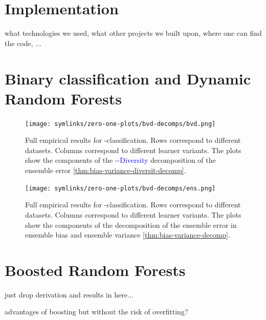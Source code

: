 \documentclass[
    a4paper, %
	fontsize=10pt, %
	twoside=false, %
]{kaobook}
\begin{document}
\begin{titlepage}
\section{Implementation}

what technologies we used, what other projects we built upon, where one can find the code, ...

\section{Binary classification and Dynamic Random Forests}
\label{sec:drf-full-results}



\begin{figure}[hb]
	\texttt{[image: symlinks/zero-one-plots/bvd-decomps/bvd.png]}
	\caption{
        Full empirical results for \zeroone-classification. Rows correspond to different datasets. Columns correspond to different learner variants. The plots show the components of the 
        \textcolor{orange}{}-\textcolor{green}{}-\textcolor{blue}{Diversity} decomposition of the ensemble error \ref{thm:bias-variance-diversit-decomp}.
    }
    \label{fig:zero-one-bvd-plots}
\end{figure}

\begin{figure}[hb]
	\texttt{[image: symlinks/zero-one-plots/bvd-decomps/ens.png]}
	\caption{
        Full empirical results for \zeroone-classification. Rows correspond to different datasets. Columns correspond to different learner variants. The plots show the components of the 
        decomposition of the ensemble error in ensemble bias and ensemble variance \ref{thm:bias-variance-decomp}.
    }
    \label{fig:zero-one-bvd-plots}
\end{figure}


\section{Boosted Random Forests}

just drop derivation and results in here...

advantages of boosting but without the risk of overfitting?


\end{titlepage}
\end{document}
